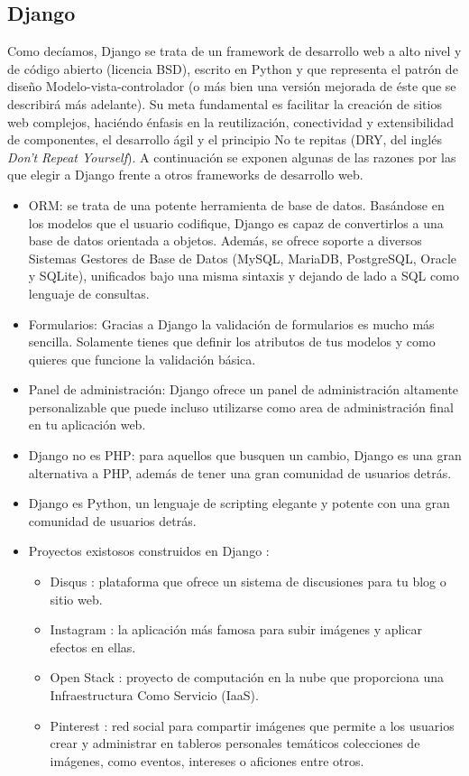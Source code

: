 \subsection{Django} \cite{Dj}
Como decíamos, Django se trata de un framework de desarrollo web a alto nivel y de código abierto (licencia BSD), escrito en Python y que representa el patrón de diseño Modelo-vista-controlador (o más bien una versión mejorada de éste que se describirá más adelante). Su meta fundamental es facilitar la creación de sitios web complejos, haciéndo énfasis en la reutilización, conectividad y extensibilidad de componentes, el desarrollo ágil y el principio No te repitas (DRY, del inglés \textit{Don't Repeat Yourself}). A continuación se exponen algunas de las razones por las que elegir a Django frente a otros frameworks de desarrollo web.

\begin{itemize}
    \item ORM: se trata de una potente herramienta de base de datos. Basándose en los modelos que el usuario codifique, Django es capaz de convertirlos a una base de datos orientada a objetos. Además, se ofrece soporte a diversos Sistemas Gestores de Base de Datos (MySQL, MariaDB, PostgreSQL, Oracle y SQLite), unificados bajo una misma sintaxis y dejando de lado a SQL como lenguaje de consultas.
    \item Formularios: Gracias a Django la validación de formularios es mucho más sencilla. Solamente tienes que definir los atributos de tus modelos y como quieres que funcione la validación básica.
    \item Panel de administración: Django ofrece un panel de administración altamente personalizable que puede incluso utilizarse como area de administración final en tu aplicación web.
    \item Django no es PHP: para aquellos que busquen un cambio, Django es una gran alternativa a PHP, además de tener una gran comunidad de usuarios detrás.
    \item Django es Python, un lenguaje de scripting elegante y potente con una gran comunidad de usuarios detrás.
    \item Proyectos existosos construidos en Django \cite{SUDj}: 
    \begin{itemize}
        \item Disqus \cite{Disqus}: plataforma que ofrece un sistema de discusiones para tu blog o sitio web.
        \item Instagram \cite{Instagram}: la aplicación más famosa para subir imágenes y aplicar efectos en ellas.
        \item Open Stack \cite{Open Stack}: proyecto de computación en la nube que proporciona una Infraestructura Como Servicio (IaaS).
        \item Pinterest \cite{Pinterest}: red social para compartir imágenes que permite a los usuarios crear y administrar en tableros personales temáticos colecciones de imágenes, como eventos, intereses o aficiones entre otros.
    \end{itemize}
\end{itemize}

